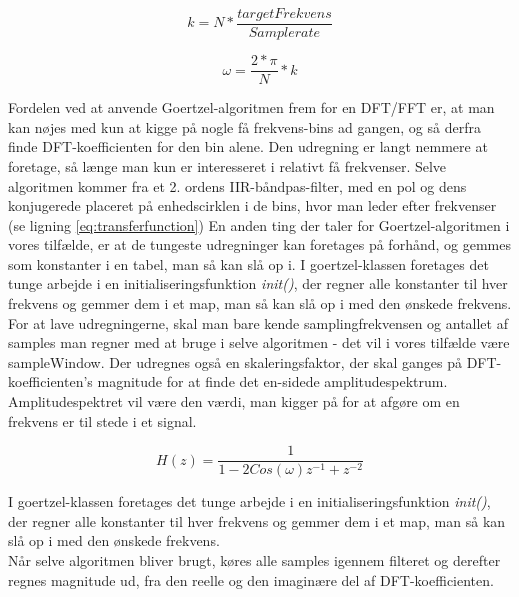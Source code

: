 \noindent\begin{minipage}{.5\linewidth}
\begin{equation} \label{eq:targetBin}
 k=N*\dfrac{targetFrekvens}{Samplerate}
\end{equation}
\end{minipage}%
\begin{minipage}{.5\linewidth}
\begin{equation}
\label{eq:omega}  
\omega = \dfrac{2*\pi}{N}*k
\end{equation}
\end{minipage}


Fordelen ved at anvende Goertzel-algoritmen frem for en DFT/FFT er, at man kan nøjes med kun at kigge på nogle få frekvens-bins ad gangen, og så derfra finde DFT-koefficienten for den bin alene. Den udregning er langt nemmere at foretage, så længe man kun er interesseret i relativt få frekvenser. Selve algoritmen kommer fra et 2. ordens IIR-båndpas-filter, med en pol og dens konjugerede placeret på enhedscirklen i de bins, hvor man leder efter frekvenser (se ligning \eqref{eq:transferfunction}) En anden ting der taler for Goertzel-algoritmen i vores tilfælde, er at de tungeste udregninger kan foretages på forhånd, og gemmes som konstanter i en tabel, man så kan slå op i. I goertzel-klassen foretages det tunge arbejde i en initialiseringsfunktion \textit{init()}, der regner alle konstanter til hver frekvens og gemmer dem i et map, man så kan slå op i med den ønskede frekvens. For at lave udregningerne, skal man bare kende samplingfrekvensen og antallet af samples man regner med at bruge i selve algoritmen - det vil i vores tilfælde være sampleWindow. Der udregnes også en skaleringsfaktor, der skal ganges på DFT-koefficienten's magnitude for at finde det en-sidede amplitudespektrum. Amplitudespektret vil være den værdi, man kigger på for at afgøre om en frekvens er til stede i et signal. 



\begin{equation}\label{eq:transferfunction}
H(z) = \frac{1}{1-2Cos(\omega)z^{-1}+z^{-2}}
\end{equation}


I goertzel-klassen foretages det tunge arbejde i en initialiseringsfunktion \textit{init()}, der regner alle konstanter til hver frekvens og gemmer dem i et map, man så kan slå op i med den ønskede frekvens. \\
Når selve algoritmen bliver brugt, køres alle samples igennem filteret og derefter regnes magnitude ud, fra den reelle og den imaginære del af DFT-koefficienten.





